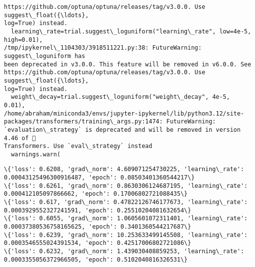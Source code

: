\documentclass[11pt]{article}
\begin{document}
\begin{Verbatim}[commandchars=\\\{\}]
https://github.com/optuna/optuna/releases/tag/v3.0.0. Use suggest\_float({\ldots},
log=True) instead.
  learning\_rate=trial.suggest\_loguniform("learning\_rate", low=4e-5, high=0.01),
/tmp/ipykernel\_1104303/3918511221.py:38: FutureWarning: suggest\_loguniform has
been deprecated in v3.0.0. This feature will be removed in v6.0.0. See
https://github.com/optuna/optuna/releases/tag/v3.0.0. Use suggest\_float({\ldots},
log=True) instead.
  weight\_decay=trial.suggest\_loguniform("weight\_decay", 4e-5, 0.01),
/home/abraham/miniconda3/envs/jupyter-ipykernel/lib/python3.12/site-
packages/transformers/training\_args.py:1474: FutureWarning:
`evaluation\_strategy` is deprecated and will be removed in version 4.46 of 🤗
Transformers. Use `eval\_strategy` instead
  warnings.warn(
    \end{Verbatim}

    \begin{Verbatim}[commandchars=\\\{\}]
\{'loss': 0.6208, 'grad\_norm': 4.609071254730225, 'learning\_rate':
0.00043125496300916487, 'epoch': 0.08503401360544217\}
\{'loss': 0.6261, 'grad\_norm': 0.8630306124687195, 'learning\_rate':
0.000412105097866662, 'epoch': 0.17006802721088435\}
\{'loss': 0.617, 'grad\_norm': 0.47822126746177673, 'learning\_rate':
0.0003929552327241591, 'epoch': 0.25510204081632654\}
\{'loss': 0.6055, 'grad\_norm': 1.0605601072311401, 'learning\_rate':
0.00037380536758165625, 'epoch': 0.3401360544217687\}
\{'loss': 0.6239, 'grad\_norm': 10.253633499145508, 'learning\_rate':
0.0003546555024391534, 'epoch': 0.42517006802721086\}
\{'loss': 0.6232, 'grad\_norm': 1.439030408859253, 'learning\_rate':
0.0003355056372966505, 'epoch': 0.5102040816326531\}
    \end{Verbatim}
\end{document}
